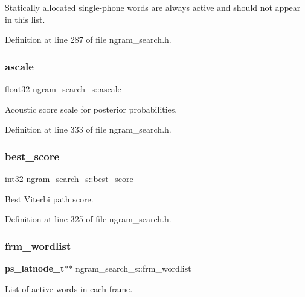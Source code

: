 Statically allocated single-\/phone words are always active and should not appear in this list. 

Definition at line 287 of file ngram\+\_\+search.\+h.

\mbox{\label{structngram__search__s_a1e3d4b67e4b11c6c11ebe16552d53d2d}} 
\subsubsection{ascale}
{\footnotesize\ttfamily float32 ngram\+\_\+search\+\_\+s\+::ascale}



Acoustic score scale for posterior probabilities. 



Definition at line 333 of file ngram\+\_\+search.\+h.

\mbox{\label{structngram__search__s_a150d99157e2f37a6f0dbb4b02682d9c3}} 
\subsubsection{best\+\_\+score}
{\footnotesize\ttfamily int32 ngram\+\_\+search\+\_\+s\+::best\+\_\+score}



Best Viterbi path score. 



Definition at line 325 of file ngram\+\_\+search.\+h.

\mbox{\label{structngram__search__s_aa54544457c363ccccb87fc7ec63a5f3e}} 
\subsubsection{frm\+\_\+wordlist}
{\footnotesize\ttfamily \textbf{ ps\+\_\+latnode\+\_\+t}$\ast$$\ast$ ngram\+\_\+search\+\_\+s\+::frm\+\_\+wordlist}



List of active words in each frame. 



